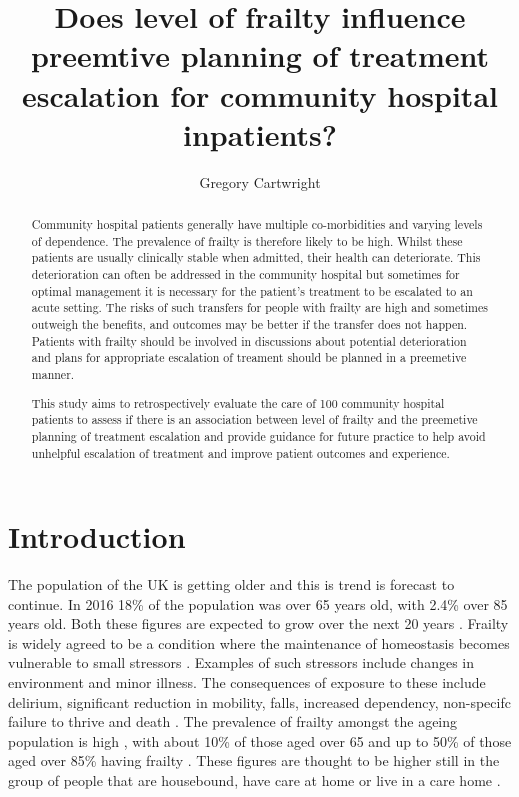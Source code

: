 \documentclass
[
	12pt,
	a4paper,
	oneside,
]{article}
\begin{document}
\author{Gregory Cartwright}
\title{Does level of frailty influence preemtive planning of treatment escalation 
	for community hospital inpatients?
}
\maketitle
\begin{abstract}
Community hospital patients generally have multiple co-morbidities and varying
levels of dependence. The prevalence of frailty is therefore likely to be high.
Whilst these patients are usually clinically stable when admitted, their health
can deteriorate. This deterioration can often be addressed in the community hospital
but sometimes for optimal management it is necessary for the patient's treatment to be
escalated to an acute setting. The risks of such transfers for people with frailty are high
and sometimes outweigh the benefits, and outcomes may be better if the transfer
does not happen. Patients with frailty should be involved in discussions about
potential deterioration and plans for appropriate escalation of treament should
be planned in a preemetive manner.

This study aims to retrospectively evaluate the care of 100 community hospital
patients to assess if there is an association between level of frailty and the preemetive
planning of treatment escalation and provide guidance for future practice to 
help avoid unhelpful escalation of treatment and improve patient outcomes and 
experience.
\end{abstract}
\section{Introduction}

The population of the UK is getting older and this is trend is forecast to continue.
In 2016 18\% of the population was over 65 years old, with 2.4\% over 85 years old.
Both these figures are expected to grow over the next 20 years \parencite{ons:17}.
Frailty is widely agreed to be a condition where the maintenance of homeostasis 
becomes vulnerable to 
small stressors \parencite{vellas:16}.  Examples of such stressors include changes in environment and minor
illness. The consequences of exposure to these include delirium, significant reduction in mobility,
falls, increased dependency, non-specifc failure to thrive and death 
\parencite{bgs:14,vellas:16,oliver:14}.
The prevalence of frailty amongst the ageing population is high \parencite{clegg:13},
with about 10\% of those aged over 65 and up to 50\% of
those aged over 85\% having frailty \parencite{bgs:14}. These figures
are thought to be higher still in the group of people that are housebound, 
have care at home or live in a care home \parencite{oliver:14}.
\end{document}
